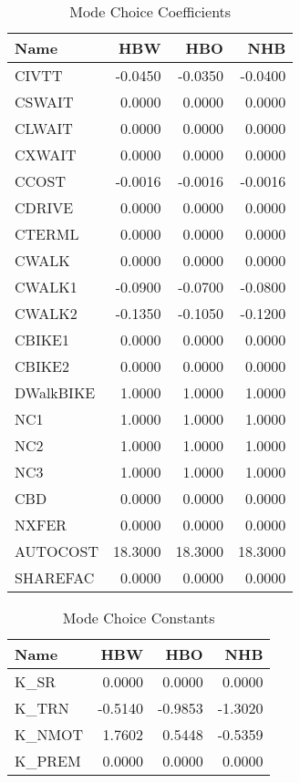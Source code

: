 \documentclass[3p, authoryear, review]{elsarticle} %
\begin{document}
\begin{table}

\caption{\label{tab:MCcoeff}Mode Choice Coefficients}
\centering
\begin{tabular}[t]{l|r|r|r}
\hline
Name & HBW & HBO & NHB\\
\hline
CIVTT & -0.0450 & -0.0350 & -0.0400\\
\hline
CSWAIT & 0.0000 & 0.0000 & 0.0000\\
\hline
CLWAIT & 0.0000 & 0.0000 & 0.0000\\
\hline
CXWAIT & 0.0000 & 0.0000 & 0.0000\\
\hline
CCOST & -0.0016 & -0.0016 & -0.0016\\
\hline
CDRIVE & 0.0000 & 0.0000 & 0.0000\\
\hline
CTERML & 0.0000 & 0.0000 & 0.0000\\
\hline
CWALK & 0.0000 & 0.0000 & 0.0000\\
\hline
CWALK1 & -0.0900 & -0.0700 & -0.0800\\
\hline
CWALK2 & -0.1350 & -0.1050 & -0.1200\\
\hline
CBIKE1 & 0.0000 & 0.0000 & 0.0000\\
\hline
CBIKE2 & 0.0000 & 0.0000 & 0.0000\\
\hline
DWalkBIKE & 1.0000 & 1.0000 & 1.0000\\
\hline
NC1 & 1.0000 & 1.0000 & 1.0000\\
\hline
NC2 & 1.0000 & 1.0000 & 1.0000\\
\hline
NC3 & 1.0000 & 1.0000 & 1.0000\\
\hline
CBD & 0.0000 & 0.0000 & 0.0000\\
\hline
NXFER & 0.0000 & 0.0000 & 0.0000\\
\hline
AUTOCOST & 18.3000 & 18.3000 & 18.3000\\
\hline
SHAREFAC & 0.0000 & 0.0000 & 0.0000\\
\hline
\end{tabular}
\end{table}

\begin{table}

\caption{\label{tab:MCconst}Mode Choice Constants}
\centering
\begin{tabular}[t]{l|r|r|r}
\hline
Name & HBW & HBO & NHB\\
\hline
K\_SR & 0.0000 & 0.0000 & 0.0000\\
\hline
K\_TRN & -0.5140 & -0.9853 & -1.3020\\
\hline
K\_NMOT & 1.7602 & 0.5448 & -0.5359\\
\hline
K\_PREM & 0.0000 & 0.0000 & 0.0000\\
\hline
\end{tabular}
\end{table}
\end{document}
